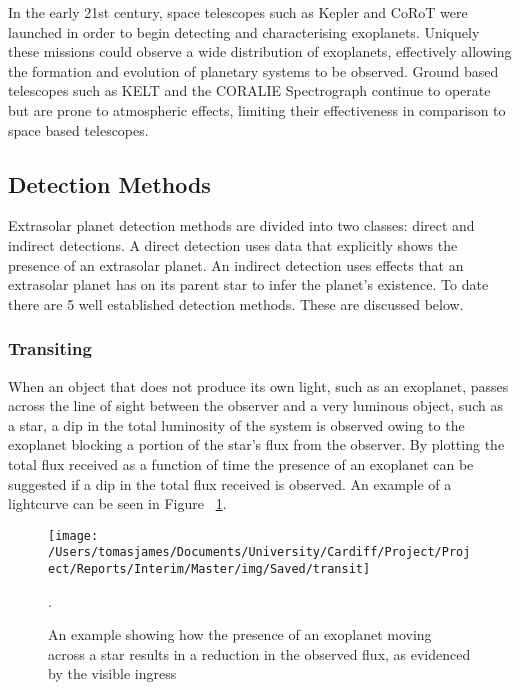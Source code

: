 \documentclass{article}
\begin{document}
In the early 21st century, space telescopes such as Kepler and CoRoT were launched in order to begin detecting and characterising exoplanets. Uniquely these missions could observe a wide distribution of exoplanets, effectively allowing the formation and evolution of planetary systems to be observed. Ground based telescopes such as KELT and the CORALIE Spectrograph continue to operate but are prone to atmospheric effects, limiting their effectiveness in comparison to space based telescopes.

\subsection{Detection Methods}
Extrasolar planet detection methods are divided into two classes: direct and indirect detections. A direct detection uses data that explicitly shows the presence of an extrasolar planet. An indirect detection uses effects that an extrasolar planet has on its parent star to infer the planet's existence. To date there are 5 well established detection methods. These are discussed below.



\subsubsection{Transiting}
When an object that does not produce its own light, such as an exoplanet, passes across the line of sight between the observer and a very luminous object, such as a star, a dip in the total luminosity of the system is observed owing to the exoplanet blocking a portion of the star's flux from the observer. By plotting the total flux received as a function of time the presence of an exoplanet can be suggested if a dip in the total flux received is observed. An example of a lightcurve can be seen in Figure ~\ref{Transit}.

\begin{figure}
\centering
    \texttt{[image: /Users/tomasjames/Documents/University/Cardiff/Project/Project/Reports/Interim/Master/img/Saved/transit]}
\caption[An example showing how the presence of an exoplanet moving across a star results in a reduction in the observed flux, as evidenced by the visible ingress.]{An example showing how the presence of an exoplanet moving across a star results in a reduction in the observed flux, as evidenced by the visible ingress \parencite{transitimg}}.\label{Transit}
\end{figure}
\end{document}
